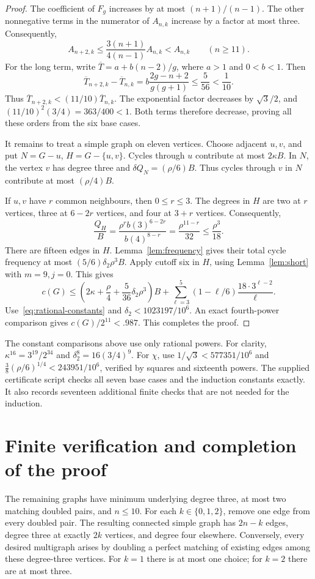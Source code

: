 \documentclass[11pt]{article}
\begin{document}
\begin{proof}
The coefficient of $F_g$ increases by at most $(n+1)/(n-1)$.
The other nonnegative terms in the numerator of $A_{n,k}$ increase by a factor at most three.
Consequently,
\[
 A_{n+2,k}\le\frac{3(n+1)}{4(n-1)}A_{n,k}<A_{n,k}\qquad(n\ge11).
\]
For the long term, write $\overline T=a+b(n-2)/g$, where $a>1$ and $0<b<1$.
Then
\[
 \overline T_{n+2,k}-\overline T_{n,k}
 =b\frac{2g-n+2}{g(g+1)}\le\frac5{56}<\frac1{10}.
\]
Thus $\overline T_{n+2,k}<(11/10)\overline T_{n,k}$.
The exponential factor decreases by $\sqrt3/2$, and $(11/10)^2(3/4)=363/400<1$.
Both terms therefore decrease, proving all these orders from the six base cases.

It remains to treat a simple graph on eleven vertices.
Choose adjacent $u,v$, and put $N=G-u$, $H=G-\{u,v\}$.
Cycles through $u$ contribute at most $2\kappa B$.
In $N$, the vertex $v$ has degree three and $\delta Q_N=(\rho/6)B$.
Thus cycles through $v$ in $N$ contribute at most $(\rho/4)B$.

If $u,v$ have $r$ common neighbours, then $0\le r\le3$.
The degrees in $H$ are two at $r$ vertices, three at $6-2r$ vertices, and four at $3+r$ vertices.
Consequently,
\[
 \frac{Q_H}{B}=\frac{\rho^r b(3)^{6-2r}}{b(4)^{8-r}}
 =\frac{\rho^{11-r}}{32}\le\frac{\rho^3}{18}.
\]
There are fifteen edges in $H$.
Lemma~\ref{lem:frequency} gives their total cycle frequency at most $(5/6)\delta_2\rho^3B$.
Apply cutoff six in $H$, using Lemma~\ref{lem:short} with $m=9,j=0$.
This gives
\[
 c(G)\le\left(2\kappa+\frac\rho4+\frac5{36}\delta_2\rho^3\right)B
       +\sum_{\ell=3}^{5}(1-\ell/6)\frac{18\cdot3^{\ell-2}}\ell.
\]
Use~\eqref{eq:rational-constants} and $\delta_2<1023197/10^6$.
An exact fourth-power comparison gives $c(G)/2^{11}<.987$.
This completes the proof.
\end{proof}

The constant comparisons above use only rational powers.
For clarity, $\kappa^{16}=3^{19}/2^{34}$ and $\delta_2^8=16(3/4)^9$.
For $\chi$, use $1/\sqrt3<577351/10^6$ and
$\frac38(\rho/6)^{1/4}<243951/10^6$, verified by squares and sixteenth powers.
The supplied certificate script checks all seven base cases and the induction constants exactly.
It also records seventeen additional finite checks that are not needed for the induction.

\section{Finite verification and completion of the proof}

The remaining graphs have minimum underlying degree three, at most two matching doubled pairs, and $n\le10$.
For each $k\in\{0,1,2\}$, remove one edge from every doubled pair.
The resulting connected simple graph has $2n-k$ edges, degree three at exactly $2k$ vertices, and degree four elsewhere.
Conversely, every desired multigraph arises by doubling a perfect matching of existing edges among these degree-three vertices.
For $k=1$ there is at most one choice; for $k=2$ there are at most three.
\end{document}
